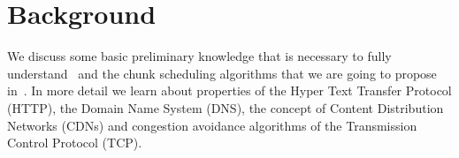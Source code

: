 \chapter{Background} %
\label{ch:background} %


We discuss some basic preliminary knowledge that is necessary to fully understand \mhttp~and the chunk scheduling algorithms that we are going to propose in~. 
In more detail we learn about properties of the Hyper Text Transfer Protocol (HTTP), the Domain Name System (DNS), the concept of Content Distribution Networks (CDNs) and congestion avoidance algorithms of the Transmission Control Protocol (TCP).

